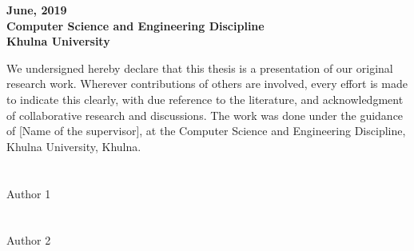 \begin{center}
\large
\textbf{June, 2019}\\
\textbf{Computer Science and Engineering Discipline}\\
\textbf{Khulna University}\\

\end{center}


We undersigned hereby declare that this thesis is a presentation of our original research work. Wherever contributions of others are involved, every effort is made to indicate this clearly, with due reference to the literature, and acknowledgment of collaborative research and discussions. The work was done under the guidance of [Name of the supervisor], at the Computer Science and Engineering Discipline, Khulna University, Khulna.\\ 
\vspace{72pt}\\
\hspace{0.5cm} \makebox[2in]{\hrulefill}\\ Author 1\\ \vspace{24pt}\\
\hspace{0.5cm} \makebox[2in]{\hrulefill}\\ Author 2\\ \vspace{24pt}\\